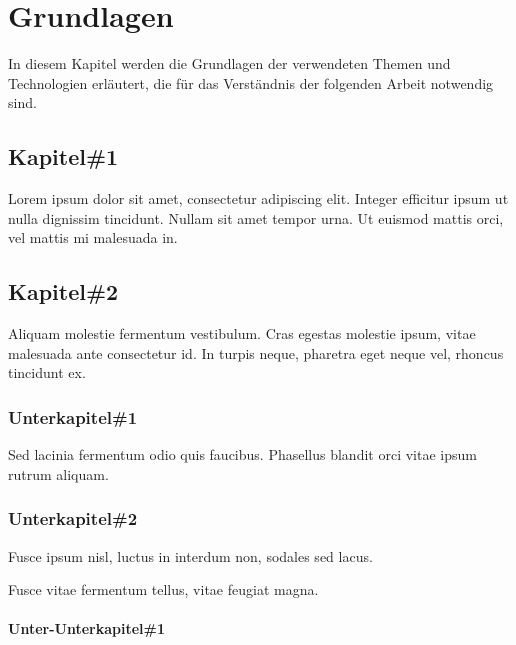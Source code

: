 \chapter{Grundlagen}

In diesem Kapitel werden die Grundlagen der verwendeten Themen und Technologien erläutert, die für das Verständnis der folgenden Arbeit notwendig sind.


\section{Kapitel\#1}

Lorem ipsum dolor sit amet, consectetur adipiscing elit. Integer efficitur ipsum ut nulla dignissim tincidunt. Nullam sit amet tempor urna. Ut euismod mattis orci, vel mattis mi malesuada in. 

\section{Kapitel\#2}

Aliquam molestie fermentum vestibulum. Cras egestas molestie ipsum, vitae malesuada ante consectetur id. In turpis neque, pharetra eget neque vel, rhoncus tincidunt ex. 


\subsection{Unterkapitel\#1}

Sed lacinia fermentum odio quis faucibus. Phasellus blandit orci vitae ipsum rutrum aliquam. 

\subsection{Unterkapitel\#2}

Fusce ipsum nisl, luctus in interdum non, sodales sed lacus. 


Fusce vitae fermentum tellus, vitae feugiat magna. 

\subsubsection{Unter-Unterkapitel\#1}

